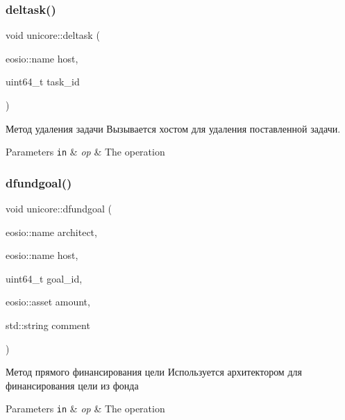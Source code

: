 \subsubsection{\texorpdfstring{deltask()}{deltask()}}
{\footnotesize\ttfamily void unicore\+::deltask (\begin{DoxyParamCaption}\item[{eosio\+::name}]{host,  }\item[{uint64\+\_\+t}]{task\+\_\+id }\end{DoxyParamCaption})}



Метод удаления задачи Вызывается хостом для удаления поставленной задачи. 


\begin{DoxyParams}[1]{Parameters}
\mbox{\tt in}  & {\em op} & The operation \\
\hline
\end{DoxyParams}
\mbox{\label{classeosio_1_1unicore_a969e75dd90699b53b75ab8482cbc49d3}} 
\subsubsection{\texorpdfstring{dfundgoal()}{dfundgoal()}}
{\footnotesize\ttfamily void unicore\+::dfundgoal (\begin{DoxyParamCaption}\item[{eosio\+::name}]{architect,  }\item[{eosio\+::name}]{host,  }\item[{uint64\+\_\+t}]{goal\+\_\+id,  }\item[{eosio\+::asset}]{amount,  }\item[{std\+::string}]{comment }\end{DoxyParamCaption})}



Метод прямого финансирования цели Используется архитектором для финансирования цели из фонда 


\begin{DoxyParams}[1]{Parameters}
\mbox{\tt in}  & {\em op} & The operation \\
\hline
\end{DoxyParams}
\mbox{\label{classeosio_1_1unicore_a403175c6abbcf360d36ec0259bccc109}} 
